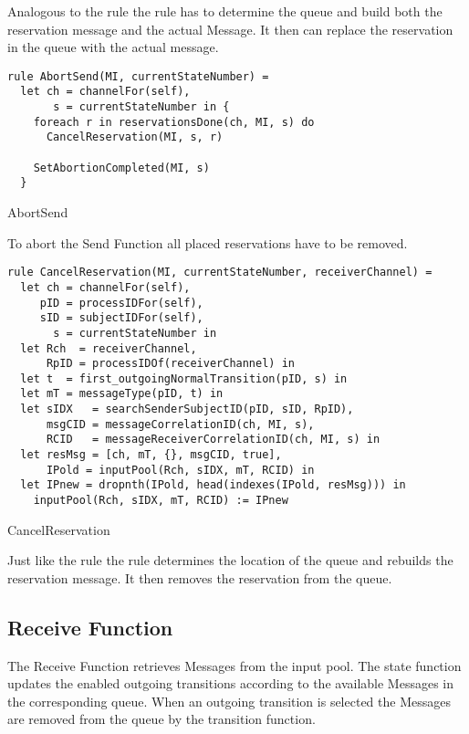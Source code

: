 Analogous to the  rule the  rule has to determine the queue and build both the reservation message and the actual Message. It then can replace the reservation in the queue with the actual message.


\begin{listing}[htbp]
\begin{verbatim}
rule AbortSend(MI, currentStateNumber) =
  let ch = channelFor(self),
       s = currentStateNumber in {
    foreach r in reservationsDone(ch, MI, s) do
      CancelReservation(MI, s, r)

    SetAbortionCompleted(MI, s)
  }
\end{verbatim}
\caption{AbortSend}
\label{lst:shortasm:AbortSend}
\end{listing}


To abort the Send Function all placed reservations have to be removed.


\begin{listing}[htbp]
\begin{verbatim}
rule CancelReservation(MI, currentStateNumber, receiverChannel) =
  let ch = channelFor(self),
     pID = processIDFor(self),
     sID = subjectIDFor(self),
       s = currentStateNumber in
  let Rch  = receiverChannel,
      RpID = processIDOf(receiverChannel) in
  let t  = first_outgoingNormalTransition(pID, s) in
  let mT = messageType(pID, t) in
  let sIDX   = searchSenderSubjectID(pID, sID, RpID),
      msgCID = messageCorrelationID(ch, MI, s),
      RCID   = messageReceiverCorrelationID(ch, MI, s) in
  let resMsg = [ch, mT, {}, msgCID, true],
      IPold = inputPool(Rch, sIDX, mT, RCID) in
  let IPnew = dropnth(IPold, head(indexes(IPold, resMsg))) in
    inputPool(Rch, sIDX, mT, RCID) := IPnew
\end{verbatim}
\caption{CancelReservation}
\label{lst:shortasm:CancelReservation}
\end{listing}


Just like the  rule the  rule determines the location of the queue and rebuilds the reservation message. It then removes the reservation from the queue.


\subsection{Receive Function}


The Receive Function retrieves Messages from the input pool. The state function updates the enabled outgoing transitions according to the available Messages in the corresponding queue. When an outgoing transition is selected the Messages are removed from the queue by the transition function.


